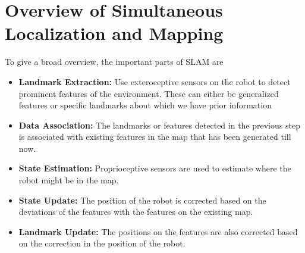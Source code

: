 \chapter{Overview of Simultaneous Localization and Mapping}

To give a broad overview, the important parts of SLAM are 
	\begin{itemize}
		\item \textbf{Landmark Extraction:} Use exteroceptive sensors on the robot to detect prominent features of the environment. These can either be generalized features or specific landmarks about which we have prior information 
		\item \textbf{Data Association:} The landmarks or features detected in the previous step is associated with existing features in the map that has been generated till now. 
		\item \textbf{State Estimation:} Proprioceptive sensors are used to estimate where the robot might be in the map. 
		\item \textbf{State Update:} The position of the robot is corrected based on the deviations of the features with the features on the existing map. 
		\item \textbf{Landmark Update:} The positions on the features are also corrected based on the correction in the position of the robot. 
	\end{itemize}
